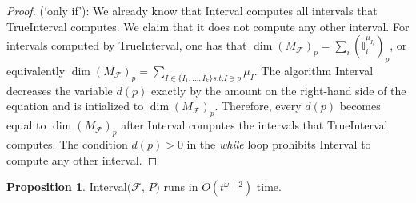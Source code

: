 \documentclass[11pt]{article}
\theoremstyle{definition}
\newtheorem{proposition}[theorem]{Proposition}
\newcommand{\I}{\mathbb{I}}
\newcommand{\Pb}{P}
\newcommand{\NN}{t}
\begin{document}
\begin{proof}
(`only if'): We already know that {\sc Interval} computes all intervals
that {\sc TrueInterval} computes. We claim that it does not compute any other
interval. For intervals computed by {\sc TrueInterval}, one has that
$\dim (M_{\mathcal F})_p=\sum_i(\I_i^{\mu_{I_i}})_p$, or equivalently
$\dim (M_{\mathcal F})_p=\sum_{I\in\{I_1,\ldots,I_k\} s.t. I\ni p} \mu_I$. The algorithm
{\sc Interval} decreases the variable $d(p)$ exactly by the amount
on the right-hand side of the equation and is intialized to $\dim(M_{\mathcal F})_p$. Therefore,
every $d(p)$ becomes equal to $\dim(M_{\mathcal F})_p$ after {\sc Interval} computes the intervals that
{\sc TrueInterval} computes. The condition $d(p)>0$ in the
{\it while} loop prohibits {\sc Interval} to compute any other interval.
\end{proof}



\begin{proposition}\label{prop:Interval time complexity}
{\sc Interval}$(\mathcal F$, $\Pb)$ runs in $O(\NN^{\omega +2})$ time.
\label{prop:timeInterval}
\end{proposition}
\end{document}
